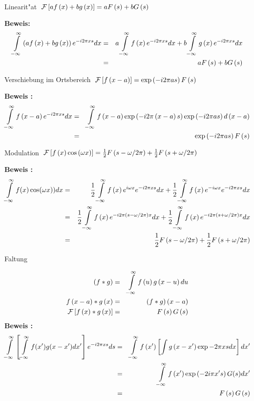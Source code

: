 \documentclass[11pt,twoside]{report}
\begin{document}
\begin{satz} Linearit"at
$ \; {\cal F}\left[ af \left( x \right) + bg \left( x \right) \right] = aF\left( s \right) + bG\left( s \right) $
\end{satz}
{\bf Beweis:}
\begin{eqnarray*}
  \int\limits_{-\infty}^{\infty} \left( af\left( x\right) + bg\left( x\right) \right)e^{ -i2\pi xs } dx & = & 
  a \int\limits_{-\infty}^{\infty} f\left( x\right) e^{ -i2\pi xs } dx + b \int\limits_{-\infty}^{\infty} g\left( x \right) e^{ -i2\pi xs } dx \\ & = &
  aF\left( s \right) + bG \left( s \right)    
\end{eqnarray*}
\vfill

\begin{satz}
Verschiebung im Ortsbereich $\; {\cal F}\left[ f \left( x-a \right) \right] = \exp\left( -i2\pi as\right) F\left( s \right) $
\end{satz}
{\bf Beweis :}
\begin{eqnarray*}
  \int\limits_{-\infty}^{\infty} f\left( x-a \right) e^{ -i2\pi xs } dx & = & 
  \int\limits_{-\infty}^{\infty} f\left( x-a \right) \exp\left(-i2\pi\left( x-a \right) s\right) \exp\left( -i2\pi as \right) d\left( x-a \right) \\
  & = & \exp \left( -i2\pi as \right) F\left( s \right)
\end{eqnarray*}
\vfill

\begin{satz}
Modulation $\; 
{\cal F}\left[ f\left( x \right) \cos \left( \omega x \right) \right] = \frac{1}{2} F\left( s-\omega /2\pi \right) + \frac{1}{2} F\left(s+\omega /2\pi \right) $
\end{satz}
{\bf Beweis :}
\begin{eqnarray*} 
  \int\limits_{-\infty}^{\infty} f(x)\cos( \omega x )) dx 
  & = & {1 \over 2} \int\limits_{-\infty}^{\infty} f\left (x \right) e^{ i\omega x } e^{-i2\pi xs} dx +
        {1 \over 2} \int\limits_{-\infty}^{\infty} f\left( x \right) e^{-i\omega x } e^{-i2\pi xs} dx    \\
  & = & {1 \over 2} \int\limits_{-\infty}^{\infty} f\left( x \right) e^{-i2\pi (s -\omega / 2\pi) x} dx +  
        {1 \over 2} \int\limits_{-\infty}^{\infty} f\left( x \right) e^{-i2\pi (s +\omega / 2\pi) x} dx    \\
  & = & {1 \over 2} F\left( s-\omega / 2\pi \right) + {1 \over 2} F\left( s+\omega / 2\pi \right)
\end{eqnarray*}  
 
\newpage  
\begin{satz}
  Faltung
\end{satz}
\begin{eqnarray*}
\left( f*g \right) & = & \int\limits_{-\infty}^{\infty} f\left( u \right) g \left( x-u \right) du \\ 
f\left( x-a \right) * g\left( x\right) & = & \left( f*g \right) \left( x-a \right) \\
{\cal F} \left[ f\left( x\right)*g\left( x \right)\right] & = & F\left( s \right) G\left( s\right) 
\end{eqnarray*}
{\bf Beweis :}
\begin{eqnarray*}
  \int\limits_{-\infty}^{\infty} \left[ \int\limits_{-\infty}^{\infty} f(x')g(x-x')dx' \right] e^{ -i2\pi xs } ds   
  & = & \int\limits_{-\infty}^{\infty} f\left( x' \right) \left[ \int g\left( x-x'\right) \exp{-2\pi xs} dx \right] dx' \\
  & = & \int\limits_{-\infty}^{\infty} f\left( x' \right) \exp\left( -2i\pi x's\right) G(s) dx' \\
  & = & F\left( s \right) G\left( s \right)
\end{eqnarray*}
   
\end{document}
